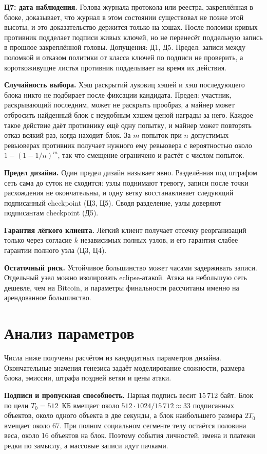 \documentclass[10pt,a4paper]{article}
\begin{document}
\textbf{Ц7: дата наблюдения.}
Голова журнала протокола или реестра, закреплённая в блоке, доказывает, что журнал в этом состоянии существовал не позже этой высоты, и это доказательство держится только на хэшах.
После поломки кривых противник подделает подписи живых ключей, но не перенесёт поддельную запись в прошлое закреплённой головы.
Допущения: Д1, Д5.
Предел: записи между поломкой и отказом политики от класса ключей по подписи не проверить, а короткоживущие листья противник подделывает на время их действия.

\textbf{Случайность выбора.}
Хэш раскрытий луковиц хэшей и хэш последующего блока никто не подбирает после фиксации кандидата.
Предел: участник, раскрывающий последним, может не раскрыть прообраз, а майнер может отбросить найденный блок с неудобным хэшем ценой награды за него.
Каждое такое действие даёт противнику ещё одну попытку, и майнер может повторять отказ всякий раз, когда находит блок.
За $m$ попыток при $n$ допустимых ревьюверах противник получает нужного ему ревьювера с вероятностью около $1-(1-1/n)^m$, так что смещение ограничено и растёт с числом попыток.

\textbf{Предел дизайна.}
Один предел дизайн называет явно.
Разделённая под штрафом сеть сама до суток не сходится: узлы поднимают тревогу, записи после точки расхождения не окончательны, и одну ветку восстанавливает следующий подписанный checkpoint (Ц3, Ц5).
Сводя разделение, узлы доверяют подписантам checkpoint (Д5).

\textbf{Гарантия лёгкого клиента.}
Лёгкий клиент получает отсечку реорганизаций только через согласие $k$ независимых полных узлов, и его гарантия слабее гарантии полного узла (Ц3, Ц4).

\textbf{Остаточный риск.}
Устойчивое большинство может часами задерживать записи.
Отдельный узел можно изолировать eclipse-атакой.
Атака на небольшую сеть дешевле, чем на Bitcoin, и параметры финальности рассчитаны именно на арендованное большинство.

\section{Анализ параметров}
\label{sec:params}

Числа ниже получены расчётом из кандидатных параметров дизайна.
Окончательные значения генезиса задаёт моделирование сложности, размера блока, эмиссии, штрафа поздней ветки и цены атаки.

\textbf{Подписи и пропускная способность.}
Парная подпись весит 15\,712 байт.
Блок по цели $T_0=512$~КБ вмещает около $512\cdot1024/15\,712\approx33$ подписанных объектов, около одного объекта в две секунды, а блок наибольшего размера $2T_0$ вмещает около 67.
При полном социальном сегменте телу остаётся половина веса, около 16 объектов на блок.
Поэтому события личностей, имена и платежи редки по замыслу, а массовые записи идут пачками.
\end{document}
